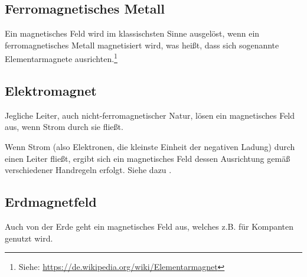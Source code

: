 




%
%	





\subsection{Ferromagnetisches Metall}

Ein magnetisches Feld wird im klassischsten Sinne ausgelöst, wenn ein ferromagnetisches Metall \glqq magnetisiert\grqq{} wird, was heißt, dass sich sogenannte Elementarmagnete ausrichten.\footnote{Siehe: \url{https://de.wikipedia.org/wiki/Elementarmagnet}}


\subsection{Elektromagnet}

Jegliche Leiter, auch nicht-ferromagnetischer Natur, lösen ein magnetisches Feld aus, wenn Strom durch sie fließt.

Wenn Strom (also Elektronen, die kleinste Einheit der negativen Ladung) durch einen Leiter fließt, ergibt sich ein magnetisches Feld dessen Ausrichtung gemäß verschiedener Handregeln erfolgt. Siehe dazu .


\subsection{Erdmagnetfeld}

Auch von der Erde geht ein magnetisches Feld aus, welches z.B. für Kompanten genutzt wird.

